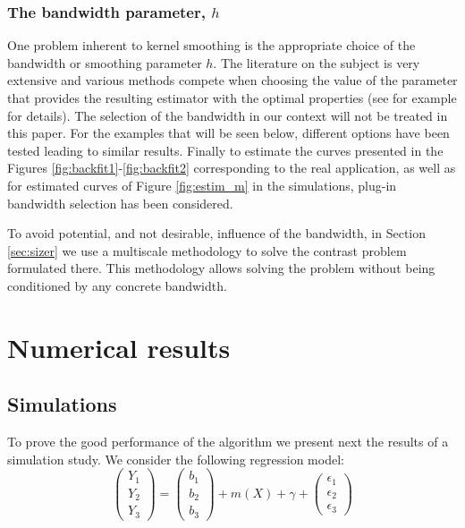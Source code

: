 \documentclass[sn-mathphys]{sn-jnl}%
\theoremstyle{thmstyleone}%
\theoremstyle{thmstyletwo}%
\theoremstyle{thmstylethree}%
\begin{document}
\subsubsection{The bandwidth parameter, $h$}
One problem inherent to kernel smoothing is the appropriate choice of the bandwidth or smoothing parameter $h$. 
The literature on the subject is very extensive and various methods compete when choosing the value of the parameter that provides the resulting estimator with the optimal properties (see for example \cite{FG1996} for details). The selection of the bandwidth in our context will not be treated in this paper. For the examples that will be seen below, different options have been tested leading to similar results. Finally to estimate the curves presented in the Figures \ref{fig:backfit1}-\ref{fig:backfit2} corresponding to the real application, as well as for estimated curves of Figure \ref{fig:estim_m} in the simulations, plug-in bandwidth selection has been considered.

To avoid potential, and not desirable, influence of the bandwidth, in Section \ref{sec:sizer} we use a multiscale methodology to solve the contrast problem formulated there. This methodology allows solving the problem without being conditioned by any concrete bandwidth.

\section{Numerical results}\label{sec:result}
\subsection{Simulations}\label{sec:simu}
To prove the good performance of the algorithm we present next the results of a simulation study. We consider the following regression model:
\begin{equation}\label{eq:model}
	\left(\begin{array}{c}
		Y_{1} \\
		Y_2 \\
		Y_3 \end{array}\right) =
	\left(\begin{array}{c}
		b_{1} \\
		b_2 \\
		b_3 \end{array}\right) +m(X) + \gamma + \left(\begin{array}{c}
		\epsilon_{1} \\
		\epsilon_2 \\
		\epsilon_3 \end{array}\right)
\end{equation}
\end{document}
